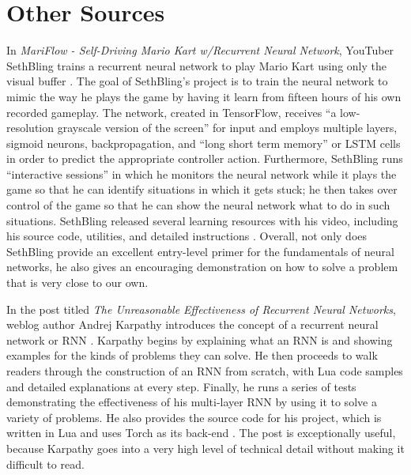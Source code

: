 \section{Other Sources}

In {\it MariFlow - Self-Driving Mario Kart w/Recurrent Neural Network}, YouTuber SethBling trains a recurrent neural network to play Mario Kart using only the visual buffer \cite{SethBling:2017}. The goal of SethBling's project is to train the neural network to mimic the way he plays the game by having it learn from fifteen hours of his own recorded gameplay. The network, created in TensorFlow, receives ``a low-resolution grayscale version of the screen'' for input and employs multiple layers, sigmoid neurons, backpropagation, and ``long short term memory'' or LSTM cells in order to predict the appropriate controller action. Furthermore, SethBling runs ``interactive sessions'' in which he monitors the neural network while it plays the game so that he can identify situations in which it gets stuck; he then takes over control of the game so that he can show the neural network what to do in such situations. SethBling released several learning resources with his video, including his source code, utilities, and detailed instructions \cite{SethBling:2017}. Overall, not only does SethBling provide an excellent entry-level primer for the fundamentals of neural networks, he also gives an encouraging demonstration on how to solve a problem that is very close to our own.

In the post titled {\it The Unreasonable Effectiveness of Recurrent Neural Networks}, weblog author Andrej Karpathy introduces the concept of a recurrent neural network or RNN \cite{Karpathy:2015}. Karpathy begins by explaining what an RNN is and showing examples for the kinds of problems they can solve. He then proceeds to walk readers through the construction of an RNN from scratch, with Lua code samples and detailed explanations at every step. Finally, he runs a series of tests demonstrating the effectiveness of his multi-layer RNN by using it to solve a variety of problems. He also provides the source code for his project, which is written in Lua and uses Torch as its back-end \cite{Karpathy:2015}. The post is exceptionally useful, because Karpathy goes into a very high level of technical detail without making it difficult to read.

